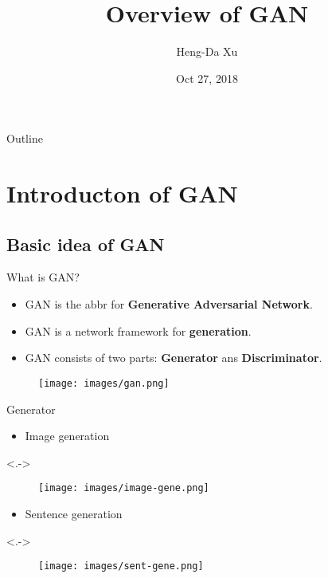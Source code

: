 \documentclass[handout]{beamer}
\title{Overview of GAN}
\author{Heng-Da Xu}
\date{Oct 27, 2018}
\begin{document}
\begin{frame}
	\titlepage
\end{frame}

\begin{frame}{Outline}
	\tableofcontents
\end{frame}

\section{Introducton of GAN}

\subsection{Basic idea of GAN}

\begin{frame}[<+->]{What is GAN?}
	\begin{itemize}
		\item GAN is the abbr for \textbf{Generative Adversarial Network}.
		\item GAN is a network framework for \textbf{generation}.
		\item GAN consists of two parts: \textbf{Generator} ans \textbf{Discriminator}.
	\end{itemize}
	\begin{actionenv}
		\begin{figure}
			\centering
			\texttt{[image: images/gan.png]}
		\end{figure}
	\end{actionenv}
\end{frame}

\begin{frame}[<+->]{Generator}
	\begin{itemize}
		\item Image generation
	\end{itemize}
	\begin{actionenv}<.->
		\begin{figure}
			\centering
			\texttt{[image: images/image-gene.png]}
		\end{figure}
	\end{actionenv}
	\begin{itemize}
		\item Sentence generation
	\end{itemize}
	\begin{actionenv}<.->
		\begin{figure}
			\centering
			\texttt{[image: images/sent-gene.png]}
		\end{figure}
	\end{actionenv}
\end{frame}
\end{document}
